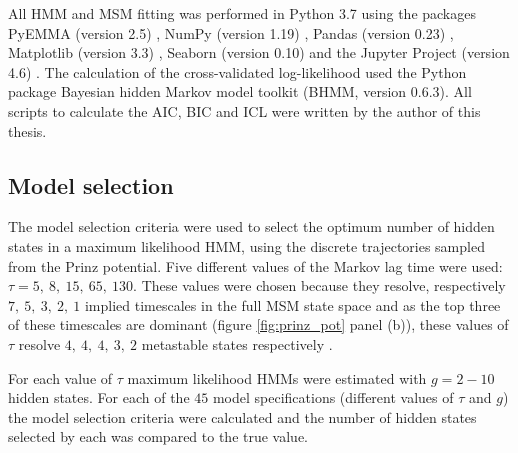 All HMM and MSM fitting was performed in Python 3.7 using the packages PyEMMA (version 2.5) \cite{schererPyEMMASoftwarePackage2015a}, NumPy (version 1.19) \cite{waltNumPyArrayStructure2011}, Pandas (version 0.23) \cite{mckinneyPandasFoundationalPython2011}, Matplotlib (version 3.3) \cite{hunterMatplotlib2DGraphics2007},  Seaborn (version 0.10) \cite{michaelwaskomMwaskomSeabornV02020} and the Jupyter Project (version 4.6) \cite{kluyverJupyterNotebooksPublishing2016}. The calculation of the cross-validated log-likelihood used the Python package Bayesian hidden Markov model toolkit (BHMM, version 0.6.3). All scripts to calculate the AIC, BIC and ICL were written by the author of this thesis. 


\subsection{Model selection}
The model selection criteria were used to select the optimum number of hidden states in a maximum likelihood HMM, using the discrete trajectories sampled from the Prinz potential. Five different values of the Markov lag time were used: $\tau=5,\ 8,\ 15,\ 65,\ 130$. These values were chosen because they resolve, respectively $7,\ 5,\ 3,\ 2,\ 1$ implied timescales in the full MSM state space and as the top three of these timescales are dominant (figure \ref{fig:prinz_pot} panel (b)), these values of $\tau$ resolve $4,\ 4,\ 4,\ 3,\ 2$ metastable states  respectively \cite{noeProjectedHiddenMarkov2013a}.

For each value of $\tau$ maximum likelihood HMMs were estimated with $g = 2 - 10$ hidden states. For each of the $45$ model specifications (different values of $\tau$ and $g$) the model selection criteria were calculated  and the number of hidden states selected by each was compared to the true value. 

